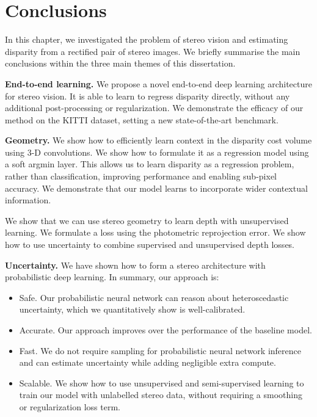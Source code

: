 \section{Conclusions}

In this chapter, we investigated the problem of stereo vision and estimating disparity from a rectified pair of stereo images. We briefly summarise the main conclusions within the three main themes of this dissertation.

\textbf{End-to-end learning.}
We propose a novel end-to-end deep learning architecture for stereo vision. It is able to learn to regress disparity directly, without any additional post-processing or regularization. We demonstrate the efficacy of our method on the KITTI dataset, setting a new state-of-the-art benchmark.

\textbf{Geometry.}
We show how to efficiently learn context in the disparity cost volume using 3-D convolutions. We show how to formulate it as a regression model using a soft argmin layer. This allows us to learn disparity as a regression problem, rather than classification, improving performance and enabling sub-pixel accuracy. We demonstrate that our model learns to incorporate wider contextual information.

We show that we can use stereo geometry to learn depth with unsupervised learning. We formulate a loss using the photometric reprojection error. We show how to use uncertainty to combine supervised and unsupervised depth losses.

\textbf{Uncertainty.}
We have shown how to form a stereo architecture with probabilistic deep learning. In summary, our approach is:
\begin{itemize}
\item Safe. Our probabilistic neural network can reason about heteroscedastic uncertainty, which we quantitatively show is well-calibrated.
\item Accurate. Our approach improves over the performance of the baseline model.
\item Fast. We do not require sampling for probabilistic neural network inference and can estimate uncertainty while adding negligible extra compute.
\item Scalable. We show how to use unsupervised and semi-supervised learning to train our model with unlabelled stereo data, without requiring a smoothing or regularization loss term.
\end{itemize}